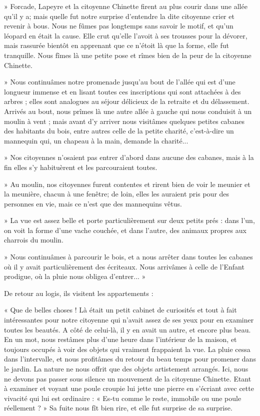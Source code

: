 » Forcade, Lapeyre et la citoyenne Chinette firent au plus courir dans une allée qu'il y a; mais quelle fut notre surprise d'entendre la dite citoyenne crier et revenir à bous. Nous ne fûmes pas longtemps sans savoir le motif, et qu'un léopard en était la cause. Elle crut qu'elle l'avoit à ses trousses pour la dévorer, mais rassurée bientôt en apprenant que ce n'étoit là que la forme, elle fut tranquille. Nous fîmes là une petite pose et rîmes bien de la peur de la citoyenne Chinette.

» Nous continuâmes notre promenade jusqu'au bout de l'allée qui est d'une longueur immense et en lisant toutes ces inscriptions qui sont attachées à des arbres ; elles sont analogues au séjour délicieux de la retraite et du délassement. Arrivés au bout, nous prîmes là une autre allée à gauche qui nous conduisit à un moulin à vent ; mais avant d'y arriver nous visitâmes quelques petites cabanes des habitants du bois, entre autres celle de la petite charité, c'est-à-dire un mannequin qui, un chapeau à la main, demande la charité...

» Nos citoyennes n'osaient pas entrer d'abord dans aucune des cabanes, mais à la fin elles s'y habituèrent et les parcouraient toutes.

» Au moulin, nos citoyennes furent contentes et rirent bien de voir le meunier et la meunière, chacun à une fenêtre; de loin, elles les auraient pris pour des personnes en vie, mais ce n'est que des mannequins vêtus.

» La vue est assez belle et porte particulièrement sur deux petits prés : dans l'un, on voit la forme d'une vache couchée, et dans l'autre, des animaux propres aux charrois du moulin.

» Nous continuâmes à parcourir le bois, et a nous arrêter dans toutes les cabanes où il y avait particulièrement des écriteaux. Nous arrivâmes à celle de l'Enfant prodigue, où la pluie nous obligea d'entrer... »

De retour au logis, ils visitent les appartements : 

« Que de belles choses ! Là était un petit cabinet de curiosités et tout à fait intéressantes pour notre citoyenne qui n'avait assez de ses yeux pour en examiner toutes les beautés. A côté de celui-là, il y en avait un autre, et encore plus beau. En un mot, nous restâmes plus d'une heure dans l'intérieur de la maison, et toujours occupés à voir des objets qui vraiment frappaient la vue. La pluie cessa dans l'intervalle, et nous profitâmes du retour du beau temps pour promener dans le jardin. La nature ne nous offrit que des objets artistement arrangés. Ici, nous ne devons pas passer sous silence un mouvement de la citoyenne Chinette. Etant à examiner et voyant une poule croupie lui jette une pierre en s'écriant avec cette vivacité qui lui est ordinaire : « Es-tu comme le reste, immobile ou une poule réellement ? » Sa fuite nous fît bien rire, et elle fut surprise de sa surprise. 

